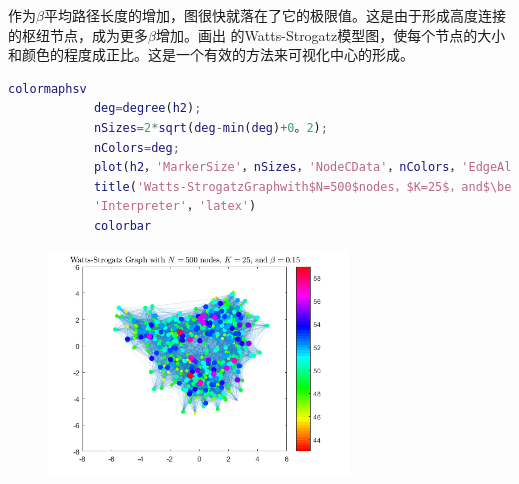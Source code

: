            \par
            作为$\beta$平均路径长度的增加，图很快就落在了它的极限值。这是由于形成高度连接的枢纽节点，成为更多$\beta$增加。画出 的Watts-Strogatz模型图，使每个节点的大小和颜色的程度成正比。这是一个有效的方法来可视化中心的形成。
            \begin{lstlisting}[language=Matlab]
            colormaphsv
            deg=degree(h2);
            nSizes=2*sqrt(deg-min(deg)+0。2);
            nColors=deg;
            plot(h2，'MarkerSize'，nSizes，'NodeCData'，nColors，'EdgeAlpha'，0。1)
            title('Watts-StrogatzGraphwith$N=500$nodes，$K=25$，and$\beta=0。15$'，。。。
            'Interpreter'，'latex')
            colorbar
             \end{lstlisting}
            \begin{figure}[H]
            \centering
            \includegraphics[height=6cm]{images/41.jpg}
            \end{figure}
